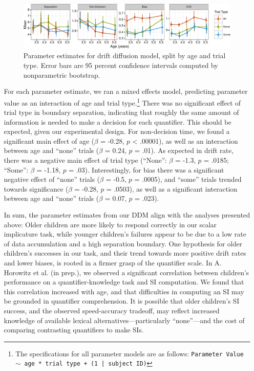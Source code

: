 \documentclass[10pt, letterpaper]{article}
\newenvironment{CodeChunk}{}{}
\begin{document}
\begin{CodeChunk}
\begin{figure}[t]

{\centering \includegraphics{figs/devo_param_plot-1} 

}

\caption[Parameter estimates for drift diffusion model, split by age and trial type]{Parameter estimates for drift diffusion model, split by age and trial type. Error bars are 95 percent confidence intervals computed by nonparametric bootstrap.}\label{fig:devo_param_plot}
\end{figure}
\end{CodeChunk}

For each parameter estimate, we ran a mixed effects model, predicting
parameter value as an interaction of age and trial
type.\footnote{The specifications for all parameter models are as follows: \texttt{Parameter Value $\sim$ age * trial type + (1 | subject ID)}}
There was no significant effect of trial type in boundary separation,
indicating that roughly the same amount of information is needed to make
a decision for each quantifier. This should be expected, given our
experimental design. For non-decision time, we found a significant main
effect of age (\(\beta\) = -0.28, \(p\) \textless{} .00001), as well as
an interaction between age and ``none'' trials (\(\beta\) = 0.24, \(p\)
= .01). As expected in drift rate, there was a negative main effect of
trial type (``None'': \(\beta\) = -1.3, \(p\) = .0185; ``Some'':
\(\beta\) = -1.18, \(p\) = .03). Interestingly, for bias there was a
significant negative effect of ``none'' trials (\(\beta\) = -0.5, \(p\)
= .0005), and ``some'' trials trended towards significance (\(\beta\) =
-0.28, \(p\) = .0503), as well as a significant interaction between age
and ``none'' trials (\(\beta\) = 0.07, \(p\) = .023).

In sum, the parameter estimates from our DDM align with the analyses
presented above: Older children are more likely to respond correctly in
our scalar implicature task, while younger children's failures appear to
be due to a low rate of data accumulation and a high separation
boundary. One hypothesis for older children's successes in our task, and
their trend towards more positive drift rates and lower biases, is
rooted in a firmer grasp of the quantifier scale. In A. Horowitz et al.
(in prep.), we observed a significant correlation between children's
performance on a quantifier-knowledge task and SI computation. We found
that this correlation increased with age, and that difficulties in
computing an SI may be grounded in quantifier comprehension. It is
possible that older children's SI success, and the observed
speed-accuracy tradeoff, may reflect increased knowledge of available
lexical alternatives---particularly ``none''---and the cost of comparing
contrasting quantifiers to make SIs.
\end{document}
